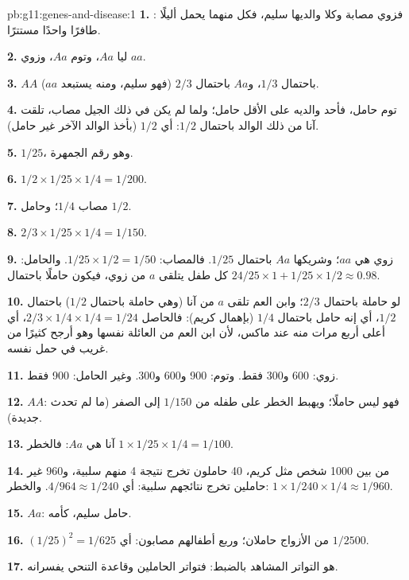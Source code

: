 \begin{solution}{pb:g11:genes-and-disease:1}
\textbf{1.} : فزوي مصابة وكلا والديها سليم، فكل منهما يحمل أليلًا
طافرًا واحدًا مستترًا.

\textbf{2.} ليا $Aa$، وتوم $Aa$، وزوي $aa$.

\textbf{3.} $AA$ باحتمال $1/3$، و$Aa$ باحتمال $2/3$ (فهو سليم، ومنه
يستبعد $aa$).

\textbf{4.} توم حامل، فأحد والديه على الأقل حامل؛ ولما لم يكن في ذلك
الجيل مصاب، تلقت آنا  من ذلك الوالد باحتمال $1/2$: أي $1/2$
(بأخذ الوالد الآخر غير حامل).

\textbf{5.} $1/25$، وهو رقم الجمهرة.

\textbf{6.} $1/2 \times 1/25 \times 1/4 = 1/200$.

\textbf{7.} مصاب $1/4$؛ وحامل $1/2$.

\textbf{8.} $2/3 \times 1/25 \times 1/4 = 1/150$.

\textbf{9.} زوي هي $aa$؛ وشريكها $Aa$ باحتمال $1/25$. فالمصاب:
$1/25 \times 1/2 = 1/50$. والحامل: كل طفل يتلقى $a$ من زوي، فيكون
حاملًا باحتمال $24/25 \times 1 + 1/25 \times
1/2 \approx 0.98$.

\textbf{10.} لو حاملة باحتمال $2/3$؛ وابن العم تلقى $a$ من آنا (وهي
حاملة باحتمال $1/2$) باحتمال $1/2$، أي إنه حامل باحتمال $1/4$ (بإهمال
كريم): فالحاصل $2/3 \times 1/4
\times 1/4 = 1/24$، أي أعلى أربع مرات منه عند ماكس، لأن ابن العم من
العائلة نفسها وهو أرجح كثيرًا من غريب في حمل  نفسه.

\textbf{11.} زوي: 600 و300 فقط. وتوم: 900 و600 و300. وغير الحامل:
900 فقط.

\textbf{12.} $AA$: فهو ليس حاملًا؛ ويهبط الخطر على طفله من $1/150$
إلى الصفر (ما لم تحدث  جديدة).

\textbf{13.} آنا هي $Aa$: فالخطر $1 \times 1/25 \times 1/4 = 1/100$.

\textbf{14.} من بين 1000 شخص مثل كريم، 40 حاملون تخرج نتيجة 4 منهم
سلبية، و960 غير حاملين تخرج نتائجهم سلبية: أي $4/964 \approx
1/240$. والخطر: $1 \times 1/240 \times 1/4 \approx 1/960$.

\textbf{15.} $Aa$: حامل سليم، كأمه.

\textbf{16.} $(1/25)^2 = 1/625$ من الأزواج حاملان؛ وربع أطفالهم
مصابون: أي $1/2500$.

\textbf{17.} هو التواتر المشاهد بالضبط: فتواتر الحاملين وقاعدة التنحي
يفسرانه.


\end{solution}

